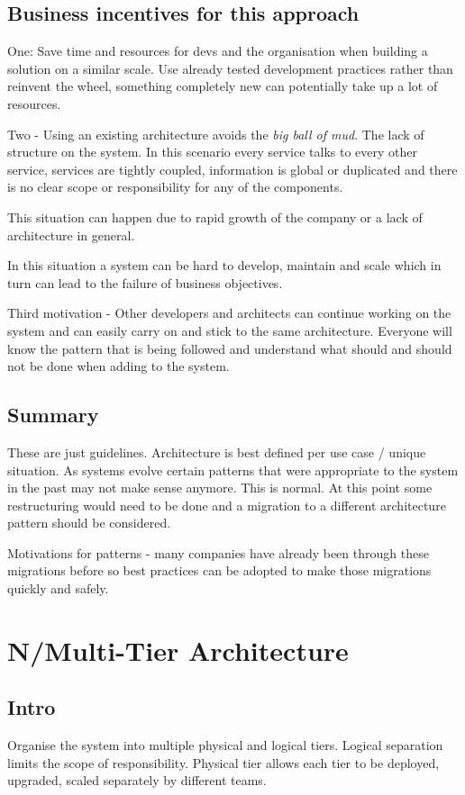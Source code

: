 \documentclass[a4paper, 11pt]{book}
\begin{document}
    \subsection{Business incentives for this approach}
    One: Save time and resources for devs and the organisation when building a solution on a similar scale.
    Use already tested development practices rather than reinvent the wheel, something completely new can potentially take up a lot of resources.


    Two - Using an existing architecture avoids the \textit{big ball of mud}.
    The lack of structure on the system.
    In this scenario every service talks to every other service, services are tightly coupled, information is global or duplicated and there is no clear scope or responsibility for any of the components.

    This situation can happen due to rapid growth of the company or a lack of architecture in general.

    In this situation a system can be hard to develop, maintain and scale which in turn can lead to the failure of business objectives.

    Third motivation - Other developers and architects can continue working on the system and can easily carry on and stick to the same architecture.
    Everyone will know the pattern that is being followed and understand what should and should not be done when adding to the system.

    \subsection{Summary}
    These are just guidelines.
    Architecture is best defined per use case / unique situation.
    As systems evolve certain patterns that were appropriate to the system in the past may not make sense anymore.
    This is normal.
    At this point some restructuring would need to be done and a migration to a different architecture pattern should be considered.

    Motivations for patterns - many companies have already been through these migrations before so best practices can be adopted to make those migrations quickly and safely.

    \section{N/Multi-Tier Architecture}

    \subsection{Intro}
    Organise the system into multiple physical and logical tiers.
    Logical separation limits the scope of responsibility.
    Physical tier allows each tier to be deployed, upgraded, scaled separately by different teams.
\end{document}
